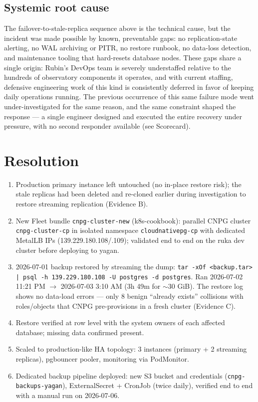 \documentclass[PMO,authoryear,toc]{lsstdoc}
\begin{document}
\subsection{Systemic root cause}

The failover-to-stale-replica sequence above is the technical cause, but the
incident was made possible by known, preventable gaps: no replication-state
alerting, no WAL archiving or PITR, no restore runbook, no data-loss
detection, and maintenance tooling that hard-resets database nodes. These gaps
share a single origin: Rubin's DevOps team is severely understaffed relative
to the hundreds of observatory components it operates, and with current
staffing, defensive engineering work of this kind is consistently deferred in
favor of keeping daily operations running. The previous occurrence of this
same failure mode went under-investigated for the same reason, and the same
constraint shaped the response --- a single engineer designed and executed the
entire recovery under pressure, with no second responder available (see
Scorecard).

\section{Resolution}

\begin{enumerate}
  \item Production primary instance left untouched (no in-place restore risk);
        the stale replicas had been deleted and re-cloned earlier during
        investigation to restore streaming replication (Evidence B).
  \item New Fleet bundle \texttt{cnpg-cluster-new} (k8s-cookbook): parallel
        CNPG cluster \texttt{cnpg-cluster-cp} in isolated namespace
        \texttt{cloudnativepg-cp} with dedicated MetalLB IPs
        (139.229.180.108/.109); validated end to end on the ruka dev cluster
        before deploying to yagan.
  \item 2026-07-01 backup restored by streaming the dump:
        \texttt{tar -xOf <backup.tar> | psql -h 139.229.180.108 -U postgres
        -d postgres}. Ran 2026-07-02 11:21 PM $\rightarrow$ 2026-07-03 3:10 AM
        (3h 49m for $\sim$30 GiB). The restore log shows no data-load errors
        --- only 8 benign ``already exists'' collisions with roles/objects
        that CNPG pre-provisions in a fresh cluster (Evidence C).
  \item Restore verified at row level with the system owners of each affected
        database; missing data confirmed present.
  \item Scaled to production-like HA topology: 3 instances (primary + 2
        streaming replicas), pgbouncer pooler, monitoring via PodMonitor.
  \item Dedicated backup pipeline deployed: new S3 bucket and credentials
        (\texttt{cnpg-backups-yagan}), ExternalSecret + CronJob (twice daily),
        verified end to end with a manual run on 2026-07-06.
\end{enumerate}
\end{document}
